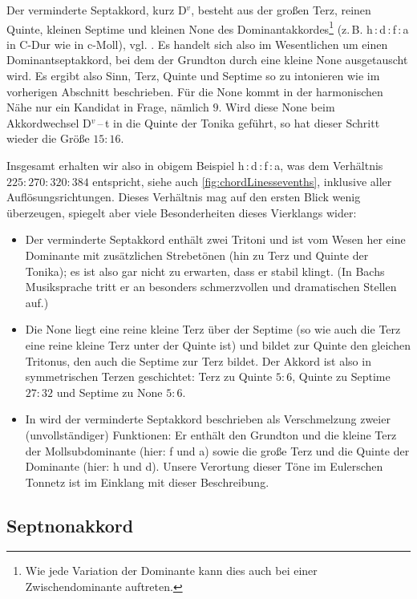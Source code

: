 Der verminderte Septakkord, kurz D$^v$, besteht aus der großen Terz, reinen
Quinte, kleinen Septime und kleinen None des Dominantakkordes\footnote{Wie jede
  Variation der Dominante kann dies auch bei einer Zwischendominante auftreten.}
(z.\,B. h\,:\,d\,:\,f\,:\,\flat a in C-Dur wie in c-Moll),
vgl. \cite[{}11.1]{Skript}. Es handelt sich also im Wesentlichen um einen
Dominantseptakkord, bei dem der Grundton durch eine kleine None ausgetauscht
wird. Es ergibt also Sinn, Terz, Quinte und Septime so zu intonieren wie im
vorherigen Abschnitt beschrieben. Für die None kommt in der harmonischen Nähe
nur ein Kandidat in Frage, nämlich \flatp $9$.  Wird diese None beim
Akkordwechsel D$^v$\,–\,t in die Quinte der Tonika geführt, so hat dieser
Schritt wieder die Größe $15:16$.

Insgesamt erhalten wir also in obigem Beispiel \naturalm
h\,:\,d\,:\,f\,:\,\flatp a, was dem Verhältnis $225:270:320:384$ entspricht,
siehe auch \cref{fig:chordLinessevenths}, inklusive aller Auflösungsrichtungen.
Dieses Verhältnis mag auf den ersten Blick wenig überzeugen, spiegelt aber viele
Besonderheiten dieses Vierklangs wider:
\begin{itemize}
\item Der verminderte Septakkord enthält zwei Tritoni und ist vom Wesen her eine
  Dominante mit zusätzlichen Strebetönen (hin zu Terz und Quinte der Tonika); es
  ist also gar nicht zu erwarten, dass er stabil klingt.  (In Bachs Musiksprache
  tritt er an besonders schmerzvollen und dramatischen Stellen auf.)
\item Die None liegt eine reine kleine Terz über der Septime (so wie auch die
  Terz eine reine kleine Terz unter der Quinte ist) und bildet zur Quinte den
  gleichen Tritonus, den auch die Septime zur Terz bildet.  Der Akkord ist also
  in symmetrischen Terzen geschichtet: Terz zu Quinte $5:6$, Quinte zu Septime
  $27:32$ und Septime zu None $5:6$.
\item In \cite[S.\,92ff.]{deLaMotte} wird der verminderte Septakkord beschrieben
  als Verschmelzung zweier (unvollständiger) Funktionen: Er enthält den Grundton
  und die kleine Terz der Mollsubdominante (hier: f und \flat a) sowie die große
  Terz und die Quinte der Dominante (hier: h und d).  Unsere Verortung dieser
  Töne im Eulerschen Tonnetz ist im Einklang mit dieser Beschreibung.
\end{itemize}

\subsection{Septnonakkord}


